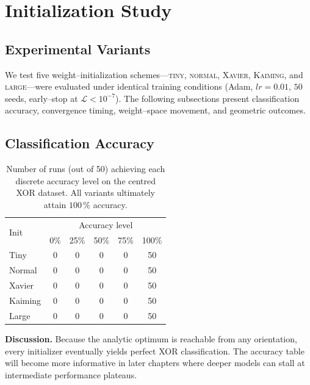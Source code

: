 ﻿%

\section{Initialization Study}
\label{sec:abs1-init}

\subsection*{Experimental Variants}
We test five weight–initialization schemes—\textsc{tiny}, \textsc{normal},
\textsc{Xavier}, \textsc{Kaiming}, and \textsc{large}—were evaluated under
identical training conditions (Adam, $lr=0.01$, $50$ seeds, early–stop at
$\mathcal L<10^{-7}$).  The following subsections present classification
accuracy, convergence timing, weight–space movement, and geometric outcomes.

\subsection*{Classification Accuracy}

\begin{table}[h]
\centering
\caption{Number of runs (out of 50) achieving each discrete accuracy level
on the centred XOR dataset.  All variants ultimately attain $100\,\%$
accuracy.}
\label{tab:abs1-init-accuracy}
\begin{tabular}{lccccc}
\toprule
\multirow{2}{*}{Init} & \multicolumn{5}{c}{Accuracy level}\\
\cmidrule(lr){2-6}
 & 0\% & 25\% & 50\% & 75\% & 100\% \\
\midrule
Tiny    & 0 & 0 & 0 & 0 & 50 \\
Normal  & 0 & 0 & 0 & 0 & 50 \\
Xavier  & 0 & 0 & 0 & 0 & 50 \\
Kaiming & 0 & 0 & 0 & 0 & 50 \\
Large   & 0 & 0 & 0 & 0 & 50 \\
\bottomrule
\end{tabular}
\end{table}

\textbf{Discussion.}  
Because the analytic optimum is reachable from any orientation, every
initializer eventually yields perfect XOR classification.  The accuracy table
will become more informative in later chapters where deeper models can stall
at intermediate performance plateaus.


